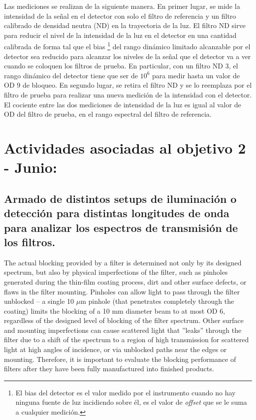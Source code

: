 \documentclass{ctuthesis}
\begin{document}
Las mediciones se realizan de la siguiente manera. En primer lugar, se mide la 
intensidad de la señal en el detector con solo el filtro de referencia y un 
filtro calibrado de densidad neutra (ND) en la trayectoria de la luz. El filtro 
ND sirve para reducir el nivel de la intensidad de la luz en el detector en 
una cantidad calibrada de forma tal que el bias \footnote{El bias del 
detector es el valor medido por el instrumento cuando no hay ninguna fuente 
de luz incidiendo sobre él, es el valor de \textit{offset} que se le suma a 
cualquier 
medición.} del rango 
dinámico limitado alcanzable por el detector sea reducido para alcanzar los 
niveles de la señal que el detector va a ver cuando se coloquen los filtros de 
prueba. En particular, con un filtro ND 3, el rango dinámico del detector tiene 
que ser de $10^{6}$ para medir hasta un valor de OD 9 de bloqueo. En segundo 
lugar, se retira el filtro ND y se lo reemplaza por el filtro de prueba para 
realizar una nueva medición de la intensidad con el detector. El cociente entre 
las dos mediciones de intensidad de la luz es igual al valor de OD del filtro 
de prueba, en el rango espectral del filtro de referencia.


\section*{Actividades asociadas al objetivo 2 - Junio:}
\subsection*{Armado de distintos setups de iluminación 
	o detección para distintas longitudes de onda para analizar los espectros 
	de transmisión de los filtros.}

The actual blocking provided by a filter is determined not only by its designed 
spectrum, but
also by physical imperfections of the filter, such as pinholes generated during 
the thin-film
coating process, dirt and other surface defects, or flaws in the filter 
mounting. Pinholes can
allow light to pass through the filter unblocked – a single 10 $\mu$m pinhole 
(that 
penetrates
completely through the coating) limits the blocking of a 10 mm diameter beam to 
at most OD 6,
regardless of the designed level of blocking of the filter spectrum. Other 
surface and mounting
imperfections can cause scattered light that ''leaks'' through the filter due 
to 
a shift of the
spectrum to a region of high transmission for scattered light at high angles of 
incidence, or via unblocked paths near the edges or mounting. Therefore, it is 
important to evaluate the blocking
performance of filters after they have been fully manufactured into finished 
products.
\end{document}
